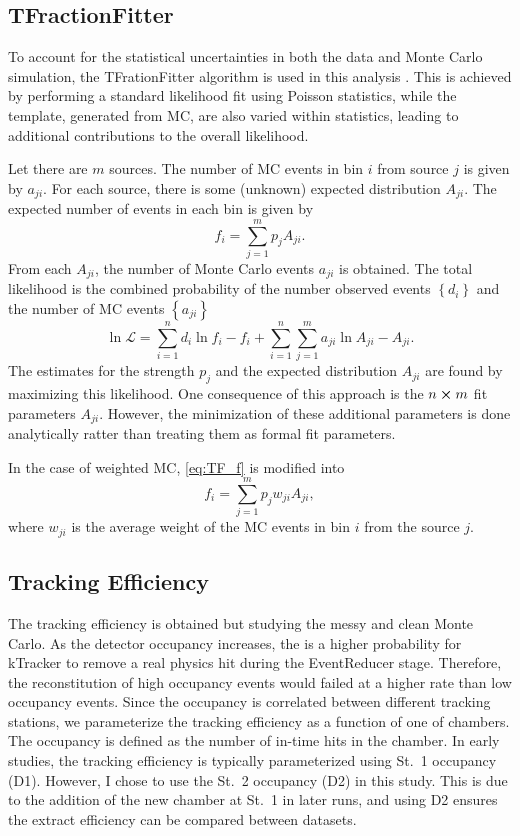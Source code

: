 \documentclass[../main.tex]{subfiles}
\begin{document}
\subsection{TFractionFitter}
To account for the statistical uncertainties in both the data and Monte Carlo
simulation, the TFrationFitter algorithm is used in this analysis \cite{barlow1993}.
This is achieved by performing a standard likelihood fit using Poisson statistics,
while the template, generated from MC, are also varied within statistics, leading
to additional contributions to the overall likelihood.

Let there are $m$ sources. The number of MC events in bin $i$ from source $j$
is given by $a_{ji}$. For each source, there is some (unknown) expected distribution
$A_{ji}$. The expected number of events in each bin is given by
\begin{equation}
	f_i = \sum^m_{j=1} p_j A_{ji}.
	\label{eq:TF_f}
\end{equation}
From each $A_{ji}$, the number of Monte Carlo events $a_{ji}$ is obtained.
The total likelihood is the combined probability of the number observed events $\left\{d_i\right\}$
and the number of MC events $\left\{a_{ji}\right\}$
\begin{equation}
	\ln \mathcal{L} = \sum^n_{i=1} d_i \ln f_i -f_i + \sum^n_{i=1} \sum^m_{j=1} a_{ji} \ln A_{ji} - A_{ji}.
	\label{eq:TF_likelihood}
\end{equation}
The estimates for the strength $p_j$ and the expected distribution $A_{ji}$ are
found by maximizing this likelihood. One consequence of this approach is the
$n \cross m$ fit parameters $A_{ji}$. However, the  minimization of these additional
parameters is done analytically ratter than treating them as formal fit parameters.

In the case of weighted MC, \cref{eq:TF_f} is modified into
\begin{equation}
	f_i = \sum^m_{j=1} p_j w_{ji}A_{ji},
\end{equation}
where $w_{ji}$ is the average weight of the MC events in bin $i$ from the source $j$.

\subsection{Tracking Efficiency}
The tracking efficiency is obtained but studying the messy and clean Monte Carlo.
As the detector occupancy increases, the is a higher probability for kTracker to
remove a real physics hit during the EventReducer stage. Therefore, the reconstitution of high occupancy
events would failed at a higher rate than low occupancy events. Since the occupancy
is correlated between different tracking stations, we parameterize the tracking efficiency
as a function of one of chambers. The occupancy is defined as the number of
in-time hits in the chamber. In early studies, the tracking efficiency is
typically parameterized using St.~1 occupancy (D1). 
However, I chose to use the St.~2 occupancy (D2) in this study. This
is due to the addition of the new chamber at St.~1 in later runs, and using D2 ensures the
extract efficiency can be compared between datasets. 
\end{document}
